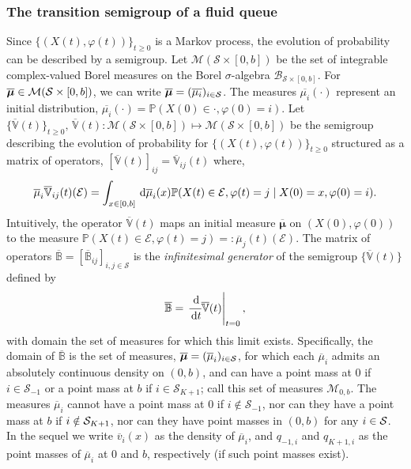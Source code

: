 \subsubsection{The transition semigroup of a fluid queue}
Since \(\{( X(t),\varphi(t))\}_{t\geq 0}\) is a Markov process, the evolution of probability can be described by a semigroup. Let $\mathcal{M}(\mathcal{S} \times [0,b])$ be the set of integrable complex-valued Borel measures on the Borel $\sigma$-algebra $\mathcal{B}_{\mathcal{S} \times [0,b]}$. For $\overline{\boldsymbol{\mu}} \in \mathcal{M}(\mathcal{S} \times [0,b])$, we can write \(\overline{\boldsymbol{\mu}} = (\overline{\mu_i})_{i \in \mathcal{S}}\). The measures \(\overline{\mu_i}(\cdot)\) represent an initial distribution, \(\overline{\mu_i}(\cdot) = \mathbb P(X(0)\in\cdot, \varphi(0) = i)\). 
Let \(\{\overline{\mathbb V}(t)\}_{t\geq 0},\, \overline{\mathbb V}(t):\mathcal{M}(\mathcal{S} \times [0,b])\mapsto \mathcal{M}(\mathcal{S} \times [0,b])\) be the semigroup describing the evolution of probability for \(\{(X(t),\varphi(t))\}_{t\geq 0}\) structured as a matrix of operators, \(\left[ \overline{\mathbb V}(t)\right]_{ij}= \overline{\mathbb V}_{ij}(t)\) where, 
\[\overline\mu_i \overline{ \mathbb V}_{ij}(t)(\mathcal{E}) = \int_{x\in[0,b]} \, \mathrm{d} \overline\mu_i(x)\mathbb P (X(t) \in\mathcal{E},\varphi(t) = j \mid X(0) = x, \varphi(0) = i).\]
Intuitively, the operator \( \overline{\mathbb V}(t)\) maps an initial measure \(\overline{\boldsymbol \mu}\) on \((X(0),\varphi(0))\) to the measure \(\mathbb P(X(t)\in \mathcal{E}, \varphi(t)=j)=:\overline\mu_j(t)(\mathcal{E})\). 
The matrix of operators \( \overline{\mathbb B}=[\overline{\mathbb B}_{ij}]_{i,j\in\mathcal S}\) is the \textit{infinitesimal generator} of the semigroup \(\{ \overline{\mathbb V}(t)\}\) defined by 
\[ \overline{\mathbb B} =\left.\cfrac{\, \mathrm{d}}{\, \mathrm{d} t} \overline{\mathbb V}(t)\right|_{t=0},\]
with domain the set of measures for which this limit exists. Specifically, the domain of \(\overline{\mathbb B}\) is the set of measures, \(\overline{\boldsymbol \mu} = (\overline\mu_i)_{i\in\mathcal{S}}\), for which each \(\overline\mu_i\) admits an absolutely continuous density on \((0,b)\), and can have a point mass at \(0\) if \(i\in\mathcal S_{-1}\) or a point mass at \(b\) if \(i\in\mathcal S_{K+1}\); call this set of measures \(\mathcal M_{0,b}\). The measures \(\overline\mu_i\) cannot have a point mass at 0 if \(i\notin \mathcal S_{-1}\), nor can they have a point mass at \(b\) if \(i\notin\mathcal{S}_{{K+1}}\), nor can they have point masses in \((0,b)\) for any \(i\in\mathcal{S}\). In the sequel we write \(\overline v_i(x)\) as the density of \(\overline\mu_i\), and \(q_{{-1},i}\) and \(q_{{K+1},i}\) as the point masses of \(\overline\mu_i\) at \(0\) and \(b\), respectively (if such point masses exist). 

